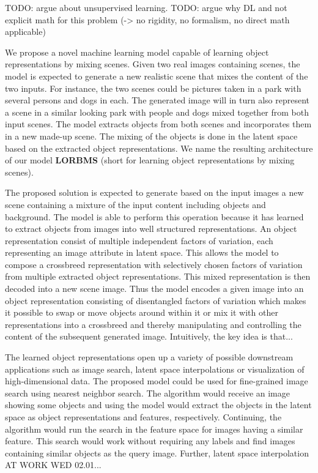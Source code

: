 \documentclass[12pt,a4paper]{article}
\begin{document}
TODO: argue about unsupervised learning.
TODO: argue why DL and not explicit math for this problem (-> no rigidity, no formalism, no direct math applicable)

We propose a novel machine learning model capable of learning object representations by mixing scenes. Given two real images containing scenes, the model is expected to generate a new realistic scene that mixes the content of the two inputs. For instance, the two scenes could be pictures taken in a park with several persons and dogs in each. The generated image will in turn also represent a scene in a similar looking park with people and dogs mixed together from both input scenes. The model extracts objects from both scenes and incorporates them in a new made-up scene. The mixing of the objects is done in the latent space based on the extracted object representations. We name the resulting architecture of our model \textbf{LORBMS} (short for learning object representations by mixing scenes).

The proposed solution is expected to generate based on the input images a new scene containing a mixture of the input content including objects and background. The model is able to perform this operation because it has learned to extract objects from images into well structured representations. An object representation consist of multiple independent factors of variation, each representing an image attribute in latent space. This allows the model to compose a crossbreed representation with selectively chosen factors of variation from multiple extracted object representations. This mixed representation is then decoded into a new scene image. Thus the model encodes a given image into an object representation consisting of disentangled factors of variation which makes it possible to swap or move objects around within it or mix it with other representations into a crossbreed and thereby manipulating and controlling the content of the subsequent generated image. 
Intuitively, the key idea is that...

The learned object representations open up a variety of possible downstream applications such as image search, latent space interpolations or visualization of high-dimensional data. The proposed model could be used for fine-grained image search using nearest neighbor search. The algorithm would receive an image showing some objects and using the model would extract the objects in the latent space as object representations and features, respectively. Continuing, the algorithm would run the search in the feature space for images having a similar feature. This search would work without requiring any labels and find images containing similar objects as the query image. Further, latent space interpolation AT WORK WED 02.01...
\end{document}
